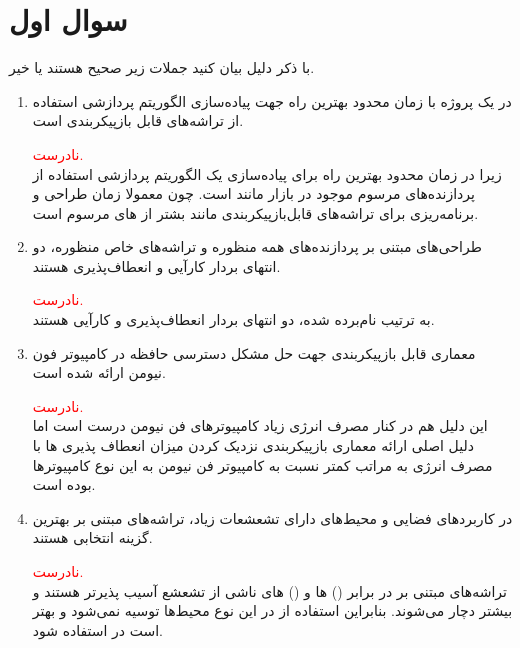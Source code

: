 \section{سوال اول}

با ذکر دلیل بیان کنید جملات زیر صحیح هستند یا خیر.

\begin{enumerate}
	\item 
	در یک پروژه با زمان محدود بهترین راه جهت پیاده‌سازی الگوریتم پردازشی استفاده از تراشه‌های قابل بازپیکربندی است.
	\begin{qsolve}
		\textcolor{red}{نادرست.}\\
		زیرا در زمان محدود بهترین راه برای پیاده‌سازی یک الگوریتم پردازشی استفاده از پردازنده‌های مرسوم موجود در بازار مانند  است. چون معمولا زمان طراحی و برنامه‌ریزی برای تراشه‌های قابل‌بازپیکربندی مانند  بشتر از  های مرسوم است.
	\end{qsolve}
	
	
	
	\item 
	طراحی‌های مبتنی بر پردازنده‌های همه منظوره و تراشه‌های خاص منظوره، دو انتهای بردار کارآیی و انعطاف‌پذیری هستند.
	\begin{qsolve}
		\textcolor{red}{نادرست.}\\
		به ترتیب نام‌برده شده، دو انتهای بردار انعطاف‌پذیری و کارآیی هستند.
	\end{qsolve}
	
	
	
	\item 
	معماری قابل بازپیکربندی جهت حل مشکل دسترسی حافظه در کامپیوتر فون نیومن ارائه شده است.
	\begin{qsolve}
		\textcolor{red}{نادرست.}\\
		این دلیل هم در کنار مصرف انرژی زیاد کامپیوتر‌های فن نیومن درست است اما دلیل اصلی ارائه معماری بازپیکربندی نزدیک کردن میزان انعطاف پذیری  ها با مصرف انرژی به مراتب کمتر نسبت به کامپیوتر فن نیومن به این نوع کامپیوترها بوده است.
	\end{qsolve}
	
	
	
	\item 
	در کاربردهای فضایی و محیط‌های دارای تشعشعات زیاد، تراشه‌های مبتنی بر  بهترین گزینه انتخابی هستند.
	\begin{qsolve}
		\textcolor{red}{نادرست.}\\
		 تراشه‌های مبتنی بر  در برابر () ها و () های ناشی از تشعشع آسیب پذیرتر هستند و بیشتر دچار  می‌شوند. بنابراین استفاده از  در این نوع محیط‌ها توسیه نمی‌شود و بهتر است در  استفاده شود.
	\end{qsolve}
	

\end{enumerate}
